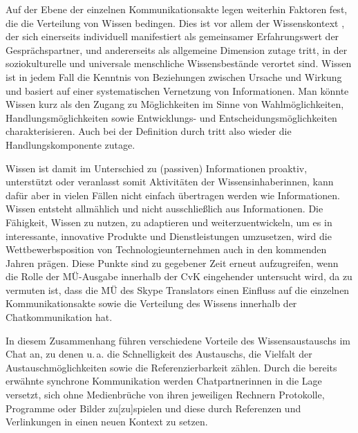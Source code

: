 Auf der Ebene der einzelnen Kommunikationsakte legen \citeauthor{koch_gesprochene_2011} weiterhin Faktoren fest, die die Verteilung von Wissen bedingen. Dies ist vor allem der \glqq Wissenskontext\grqq{} \citep[11]{koch_gesprochene_2011}, der sich einerseits individuell manifestiert als gemeinsamer Erfahrungswert der Gesprächspartner, und andererseits als allgemeine Dimension zutage tritt, in der \glqq soziokulturelle und universale menschliche Wissensbestände\grqq{} \citep[11]{koch_gesprochene_2011} verortet sind. \glqq Wissen ist in jedem Fall die Kenntnis von Beziehungen zwischen Ursache und Wirkung und basiert auf einer systematischen Vernetzung von Informationen. Man könnte Wissen kurz als den Zugang zu Möglichkeiten im Sinne von Wahlmöglichkeiten, Handlungsmöglichkeiten sowie Entwicklungs- und Entscheidungsmöglichkeiten charakterisieren.\grqq{} \citep[58]{lehner_wissensmanagement:_2014} Auch bei der Definition durch \citeauthor{lehner_wissensmanagement:_2014} tritt also wieder die Handlungskomponente zutage.

Wissen ist damit im Unterschied zu (passiven) Informationen proaktiv, unterstützt oder veranlasst somit Aktivitäten der Wissensinhaber{\textperiodcentered}innen, kann dafür aber in vielen Fällen nicht einfach übertragen werden wie Informationen. Wissen entsteht allmählich und nicht ausschließlich aus Informationen. Die Fähigkeit, Wissen zu nutzen, zu adaptieren und weiterzuentwickeln, um es in interessante, innovative Produkte und Dienstleistungen umzusetzen, wird die Wettbewerbsposition von Technologieunternehmen auch in den kommenden Jahren prägen. Diese Punkte sind zu gegebener Zeit erneut aufzugreifen, wenn die Rolle der MÜ-Ausgabe innerhalb der CvK eingehender untersucht wird, da zu vermuten ist, dass die MÜ des Skype Translators einen Einfluss auf die einzelnen Kommunikationsakte sowie die Verteilung des Wissens innerhalb der Chatkommunikation hat.

In diesem Zusammenhang führen \citet[274]{doring_wissenskommunikation_2007} verschiedene Vorteile des Wissensaustauschs im Chat an, zu denen u.\,a. die Schnelligkeit des Austauschs, die Vielfalt der Austauschmöglichkeiten sowie die Referenzierbarkeit zählen. Durch die bereits erwähnte synchrone Kommunikation werden Chatpartner{\textperiodcentered}innen in die Lage versetzt, \glqq sich ohne Medienbrüche von ihren jeweiligen Rechnern Protokolle, Programme oder Bilder zu[zu]spielen\grqq{} \citep[274]{doring_wissenskommunikation_2007} und diese durch Referenzen und Verlinkungen in einen neuen Kontext zu setzen.

